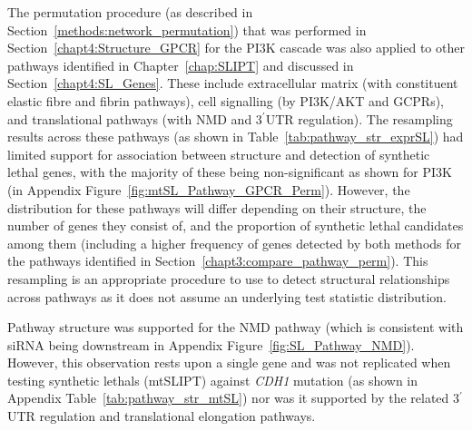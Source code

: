 The permutation procedure (as described in Section~\ref{methods:network_permutation}) that was performed in Section~\ref{chapt4:Structure_GPCR} for the \gls{PI3K} cascade was also applied to other \glspl{pathway} identified in Chapter~\ref{chap:SLIPT} and discussed in Section~\ref{chapt4:SL_Genes}. These include extracellular matrix (with constituent elastic fibre and fibrin \glspl{pathway}), cell signalling (by PI3K/AKT and GCPRs), and translational \glspl{pathway} (with \gls{NMD} and 3$^\prime$\gls{UTR} regulation). The resampling results across these \glspl{pathway} (as shown in Table~\ref{tab:pathway_str_exprSL}) had limited support for association between  structure and detection of \gls{synthetic lethal} genes, with the majority of these being non-significant as shown for \gls{PI3K} (in Appendix Figure~\ref{fig:mtSL_Pathway_GPCR_Perm}). However, the distribution for these \glspl{pathway} will differ depending on their structure, the number of genes they consist of, and the proportion of \gls{synthetic lethal} candidates among them (including a higher frequency of genes detected by both methods for the \glspl{pathway} identified in Section~\ref{chapt3:compare_pathway_perm}). This resampling is an appropriate procedure to use to detect structural relationships across \glspl{pathway} as it does not assume an underlying test statistic distribution.

Pathway structure was supported for the \gls{NMD} \gls{pathway} (which is consistent with \gls{siRNA} being downstream in Appendix Figure~\ref{fig:SL_Pathway_NMD}). However, this observation rests upon a single gene and was not replicated when testing \glspl{synthetic lethal} (\acrshort{mtSLIPT}) against \textit{CDH1} \gls{mutation} (as shown in Appendix Table~\ref{tab:pathway_str_mtSL}) nor was it supported by the related 3$^\prime$\gls{UTR} regulation and translational elongation \glspl{pathway}.

